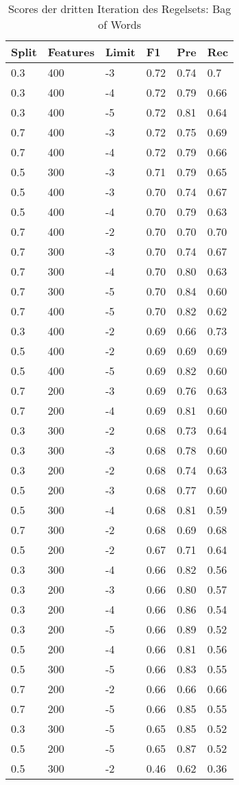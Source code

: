 \begin{table}[H]
	\caption{Scores der dritten Iteration des Regelsets: Bag of Words}
	\centering
\begin{tabular}{ | l | l | l | l | l | l | }
	\hline
	Split & Features & Limit & F1 & Pre & Rec \\ \hline
	0.3 & 400 & -3 & 0.72 & 0.74 & 0.7 \\ 
	0.3 & 400 & -4 & 0.72 & 0.79 & 0.66 \\
	0.3 & 400 & -5 & 0.72 & 0.81 & 0.64 \\
	0.7 & 400 & -3 & 0.72 & 0.75 & 0.69 \\
	0.7 & 400 & -4 & 0.72 & 0.79 & 0.66 \\
	0.5 & 300 & -3 & 0.71 & 0.79 & 0.65 \\
	0.5 & 400 & -3 & 0.70 & 0.74 & 0.67 \\
	0.5 & 400 & -4 & 0.70 & 0.79 & 0.63 \\ 
	0.7 & 400 & -2 & 0.70 & 0.70 & 0.70 \\ 
	0.7 & 300 & -3 & 0.70 & 0.74 & 0.67 \\
	0.7 & 300 & -4 & 0.70 & 0.80 & 0.63 \\
	0.7 & 300 & -5 & 0.70 & 0.84 & 0.60 \\
	0.7 & 400 & -5 & 0.70 & 0.82 & 0.62 \\ 
	0.3 & 400 & -2 & 0.69 & 0.66 & 0.73 \\ 
	0.5 & 400 & -2 & 0.69 & 0.69 & 0.69 \\ 
	0.5 & 400 & -5 & 0.69 & 0.82 & 0.60 \\ 
	0.7 & 200 & -3 & 0.69 & 0.76 & 0.63 \\ 
	0.7 & 200 & -4 & 0.69 & 0.81 & 0.60 \\ 
	0.3 & 300 & -2 & 0.68 & 0.73 & 0.64 \\ 
	0.3 & 300 & -3 & 0.68 & 0.78 & 0.60 \\ 
	0.3 & 200 & -2 & 0.68 & 0.74 & 0.63 \\ 
	0.5 & 200 & -3 & 0.68 & 0.77 & 0.60 \\ 
	0.5 & 300 & -4 & 0.68 & 0.81 & 0.59 \\ 
	0.7 & 300 & -2 & 0.68 & 0.69 & 0.68 \\ 
	0.5 & 200 & -2 & 0.67 & 0.71 & 0.64 \\ 
	0.3 & 300 & -4 & 0.66 & 0.82 & 0.56 \\ 
	0.3 & 200 & -3 & 0.66 & 0.80 & 0.57 \\
	0.3 & 200 & -4 & 0.66 & 0.86 & 0.54 \\
	0.3 & 200 & -5 & 0.66 & 0.89 & 0.52 \\ 
	0.5 & 200 & -4 & 0.66 & 0.81 & 0.56 \\
	0.5 & 300 & -5 & 0.66 & 0.83 & 0.55 \\ 
	0.7 & 200 & -2 & 0.66 & 0.66 & 0.66 \\ 
	0.7 & 200 & -5 & 0.66 & 0.85 & 0.55 \\ 
	0.3 & 300 & -5 & 0.65 & 0.85 & 0.52 \\ 
	0.5 & 200 & -5 & 0.65 & 0.87 & 0.52 \\
	0.5 & 300 & -2 & 0.46 & 0.62 & 0.36 \\ \hline
\end{tabular}
\end{table}
